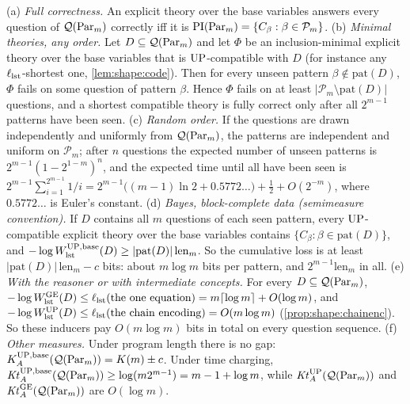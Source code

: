 \begin{theorem}\label{thm:shape:learning}
(a) \emph{Full correctness.} An explicit theory over the base variables answers every question of $\mathcal Q(\mathrm{Par}_m)$ correctly iff it is $\mathrm{PI}(\mathrm{Par}_m)=\{C_\beta:\beta\in\mathcal P_m\}$.
(b) \emph{Minimal theories, any order.} Let $D\subseteq\mathcal Q(\mathrm{Par}_m)$ and let $\Phi$ be an inclusion-minimal explicit theory over the base variables that is $\mathrm{UP}$-compatible with $D$ (for instance any $\ell_{\rm lst}$-shortest one, \cref{lem:shape:code}). Then for every unseen pattern $\beta\notin\mathrm{pat}(D)$, $\Phi$ fails on some question of pattern $\beta$. Hence $\Phi$ fails on at least $\lvert\mathcal P_m\setminus\mathrm{pat}(D)\rvert$ questions, and a shortest compatible theory is fully correct only after all $2^{m-1}$ patterns have been seen.
(c) \emph{Random order.} If the questions are drawn independently and uniformly from $\mathcal Q(\mathrm{Par}_m)$, the patterns are independent and uniform on $\mathcal P_m$; after $n$ questions the expected number of unseen patterns is $2^{m-1}(1-2^{1-m})^n$, and the expected time until all have been seen is $2^{m-1}\sum_{i=1}^{2^{m-1}}1/i=2^{m-1}\bigl((m-1)\ln2+0.5772\ldots\bigr)+\frac12+O(2^{-m})$, where $0.5772\ldots$ is Euler's constant.
(d) \emph{Bayes, block-complete data (semimeasure convention).} If $D$ contains all $m$ questions of each seen pattern, every $\mathrm{UP}$-compatible explicit theory over the base variables contains $\{C_\beta:\beta\in\mathrm{pat}(D)\}$, and $-\log W_{\mathrm{lst}}^{\mathrm{UP},\mathrm{base}}(D)\ge\lvert\mathrm{pat}(D)\rvert\,\mathrm{len}_m$. So the cumulative loss is at least $\lvert\mathrm{pat}(D)\rvert\,\mathrm{len}_m-c$ bits: about $m\log m$ bits per pattern, and $2^{m-1}\mathrm{len}_m$ in all.
(e) \emph{With the reasoner or with intermediate concepts.} For every $D\subseteq\mathcal Q(\mathrm{Par}_m)$, $-\log W_{\mathrm{lst}}^{\mathrm{GE}}(D)\le\ell_{\rm lst}(\text{the one equation})=m\lceil\log m\rceil+O(\log m)$, and $-\log W_{\mathrm{lst}}^{\mathrm{UP}}(D)\le\ell_{\rm lst}(\text{the chain encoding})=O(m\log m)$ (\cref{prop:shape:chainenc}). So these inducers pay $O(m\log m)$ bits in total on every question sequence.
(f) \emph{Other measures.} Under program length there is no gap: $K_{A}^{\mathrm{UP},\mathrm{base}}(\mathcal Q(\mathrm{Par}_m))=K(m)\pm c$. Under time charging, $\mathit{Kt}_{A}^{\mathrm{UP},\mathrm{base}}(\mathcal Q(\mathrm{Par}_m))\ge\log(m2^{m-1})=m-1+\log m$, while $\mathit{Kt}_{A}^{\mathrm{UP}}(\mathcal Q(\mathrm{Par}_m))$ and $\mathit{Kt}_{A}^{\mathrm{GE}}(\mathcal Q(\mathrm{Par}_m))$ are $O(\log m)$.
\end{theorem}

